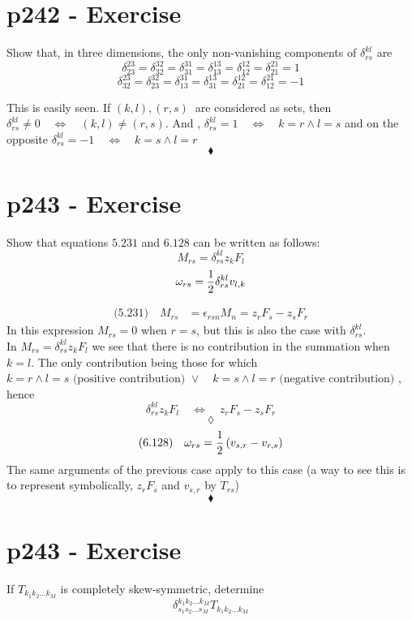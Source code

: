\section{p242 - Exercise}
\begin{tcolorbox}
Show that, in three dimensions, the only non-vanishing components of $\delta^{kl}_{rs}$ are
$$\delta^{23}_{23}=\delta^{32}_{32}=\delta^{31}_{31}=\delta^{13}_{13}=\delta^{12}_{12}=\delta^{21}_{21}=1$$
$$\delta^{23}_{32}=\delta^{32}_{23}=\delta^{31}_{13}=\delta^{13}_{31}=\delta^{12}_{21}=\delta^{21}_{12}=-1$$
\end{tcolorbox}
This is easily seen. If $(k,l), (r, s)\ $ are considered as sets, then $\delta^{kl}_{rs}\ne 0 \quad\Leftrightarrow\quad (k,l)\ne (r, s)$.
And , $\delta^{kl}_{rs}= 1 \quad\Leftrightarrow\quad k=r \wedge l=s  $ and on the opposite $\delta^{kl}_{rs}= -1 \quad\Leftrightarrow\quad k=s \wedge l=r  $
$$\blacklozenge$$
\newpage


\section{p243 - Exercise}
\begin{tcolorbox}
Show that equations $\mathbf{5.231}$ and $\mathbf{6.128}$ can be written as follows:
$$M_{rs} = \delta^{kl}_{rs}z_kF_l$$
$$\omega_{rs} = \frac{1}{2}\delta^{kl}_{rs}v_{l,k}$$
\end{tcolorbox}
\begin{align}
\text{(5.231)}\quad M_{rs}&=\epsilon_{rsn}M_n= z_rF_s-z_sF_r
\end{align}
In this expression $M_{rs}=0$ when $r=s$, but this is also the case with $\delta^{kl}_{rs}$.\\
In $M_{rs} = \delta^{kl}_{rs}z_kF_l$ we see that there is no contribution in the summation when $k=l$. The only contribution being those for which $k=r \wedge l=s \text{ (positive contribution) } \vee \quad k=s \wedge l=r \text{ (negative contribution) } $, hence $$\delta^{kl}_{rs}z_kF_l\quad\Leftrightarrow\quad z_rF_s-z_sF_r$$
$$\lozenge$$
\begin{align}
\text{(6.128)}\quad \omega_{rs} = \frac{1}{2}\left(v_{s,r}-v_{r,s}\right)
\end{align}
The same arguments of the previous case apply to this case (a way to see this is to represent symbolically,  $z_rF_s$ and $v_{s,r}$ by $T_{rs}$)
$$\blacklozenge$$
\newpage


\section{p243 - Exercise}
\begin{tcolorbox}
If $T_{k_1k_2\dots k_M}$ is completely skew-symmetric, determine 
$$\delta^{k_1k_2\dots k_M}_{s_1s_2\dots s_M}T_{k_1k_2\dots k_M}$$
\end{tcolorbox}

